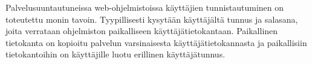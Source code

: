 Palvelusuuntautuneissa web-ohjelmistoissa käyttäjien tunnistautuminen on toteutettu monin tavoin. Tyypillisesti kysytään käyttäjältä tunnus ja salasana, joita verrataan ohjelmiston paikalliseen käyttäjätietokantaan. Paikallinen tietokanta on kopioitu palvelun varsinaisesta käyttäjätietokannasta ja paikallisiin tietokantoihin on käyttäjille luotu erillinen käyttäjätunnus.
